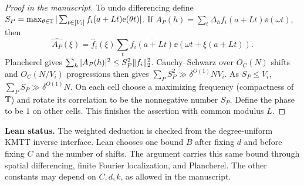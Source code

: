 \begin{proof}[Proof in the manuscript]
To undo differencing define
$S_P=\max_{\theta\in\mathbb T}|\sum_{t\in[V_i]}f_i(a+Lt)\mathrm e(\theta t)|$.
If $A_P(h)=\sum_t\Delta_h f_i(a+Lt)\ee(\omega t)$, then
\[
 \widehat{A_P}(\xi)
 =\widehat f_i(\xi)\sum_t\overline{f_i(a+Lt)}
         \ee(\omega t+\xi(a+Lt)).
\]
Plancherel gives $\sum_h|A_P(h)|^2\le S_P^2\lVert f_i\rVert_2^2$.
Cauchy--Schwarz over $O_C(N)$ shifts and $O_C(N/V_i)$ progressions
then gives $\sum_P S_P^2\gg\delta^{O(1)}NV_i$. As $S_P\le V_i$,
$\sum_P S_P\gg\delta^{O(1)}N$. On each cell choose a maximizing
frequency (compactness of $\mathbb T$) and rotate its correlation to be the
nonnegative number $S_P$. Define the phase to be $1$ on other cells.
This finishes the assertion with common modulus $L$.
\end{proof}
\noindent\textbf{Lean status.} The weighted deduction is checked
from the degree-uniform KMTT inverse interface. Lean chooses one bound
$B$ after fixing $d$ and before fixing $C$ and the number of shifts.
The argument carries this same bound through spatial differencing,
finite Fourier localization, and Plancherel. The other constants
may depend on $C,d,k$, as allowed in the manuscript.

